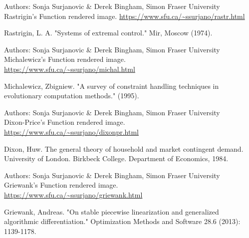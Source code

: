 \documentclass{article}
\begin{document}
\begin{thebibliography}{9}

Authors: Sonja Surjanovic \& Derek Bingham, Simon Fraser University \\ Rastrigin's Function rendered image.
  \url{https://www.sfu.ca/~ssurjano/rastr.html}

  Rastrigin, L. A. "Systems of extremal control." Mir, Moscow (1974).

Authors: Sonja Surjanovic \& Derek Bingham, Simon Fraser University \\ Michalewicz's Function rendered image.
  \url{https://www.sfu.ca/~ssurjano/michal.html}

    Michalewicz, Zbigniew. "A survey of constraint handling techniques in evolutionary computation methods." (1995).

Authors: Sonja Surjanovic \& Derek Bingham, Simon Fraser University \\ Dixon-Price's Function rendered image.
  \url{https://www.sfu.ca/~ssurjano/dixonpr.html}

Dixon, Huw. The general theory of household and market contingent demand. University of London. Birkbeck College. Department of Economics, 1984.

Authors: Sonja Surjanovic \& Derek Bingham, Simon Fraser University \\ Griewank's Function rendered image.
  \url{https://www.sfu.ca/~ssurjano/griewank.html}

Griewank, Andreas. "On stable piecewise linearization and generalized algorithmic differentiation." Optimization Methods and Software 28.6 (2013): 1139-1178.

\end{thebibliography}  
\end{document}
